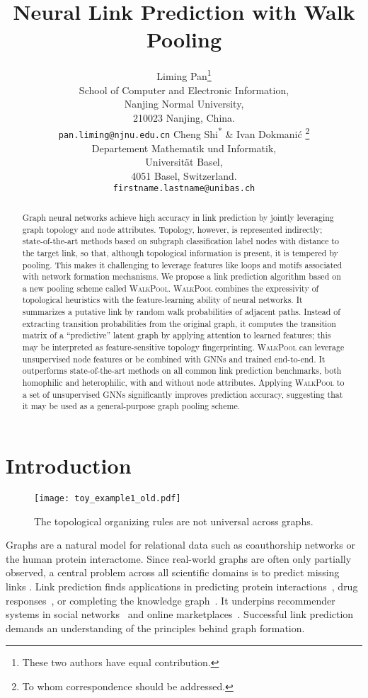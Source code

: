 \documentclass[11pt]{article}
\title{Neural Link Prediction with Walk Pooling}
\author{Liming Pan\thanks{These two authors have equal contribution.} \\
School of Computer and Electronic Information,\\
Nanjing Normal University,\\
210023 Nanjing, China. \\
\texttt{pan.liming@njnu.edu.cn}
\And
Cheng Shi\textsuperscript{*} \& Ivan Dokmanić \thanks{To whom correspondence should be addressed.}\\
Departement Mathematik und Informatik,\\
Universität Basel,\\
4051 Basel, Switzerland. \\
\texttt{firstname.lastname@unibas.ch}
}
\newcommand{\walkpool}{\textsc{WalkPool}\xspace}
\newcommand{\UPDATE}[1]{\textcolor{WowColor}{{#1}}}
\newcommand{\fTBD}[1]{\textcolor{SubtleColor}{}\marginnote{\tiny\textcolor{SubtleColor}{ {\tiny } #1}}}
\renewcommand{\fTBD}[1]{}
\renewcommand{\UPDATE}[1]{#1}
\begin{document}
\maketitle
\vspace{-4mm}
\begin{abstract}
    \vspace{-2mm}
    Graph neural networks achieve high accuracy in link prediction by jointly leveraging  graph topology and node attributes. Topology, however, is represented indirectly; state-of-the-art methods based on subgraph classification label nodes with distance to the target link, so that, although topological information is present, it is tempered by pooling. This makes it challenging to leverage features like loops and motifs associated with network formation mechanisms.\fTBD{Reminder for later: Pooling is not the only issue: even without it it would be hard (impossible?) to count loops etc from node distance labels.} We propose a link prediction algorithm based on a new pooling scheme called \walkpool. \walkpool combines the expressivity of topological heuristics with the feature-learning ability of neural networks. It summarizes a putative link by random walk probabilities of adjacent paths. Instead of extracting transition probabilities from the original graph, it computes the transition matrix of a ``predictive'' latent graph by applying attention to learned features; this may be interpreted as feature-sensitive topology fingerprinting. \walkpool can leverage unsupervised node features or be combined with GNNs and trained end-to-end. It outperforms state-of-the-art methods on all common link prediction benchmarks, both homophilic and heterophilic, with and without node attributes. Applying \walkpool to a set of unsupervised GNNs significantly improves prediction accuracy, suggesting that it may be used as a general-purpose graph pooling scheme.    
\end{abstract}
\vspace{-4mm}
\section{Introduction}
\begin{wrapfigure}{l}{0.44\textwidth} 
\centering
\texttt{[image: toy\_example1\_old.pdf]}
\caption{\UPDATE{The topological organizing rules are not universal across graphs.}}
\label{fig:learnwp}
\vspace{-2mm}
\end{wrapfigure}
Graphs are a natural model for relational data such as coauthorship networks or the human protein interactome. Since real-world graphs are often only partially observed, a central problem across all scientific domains is to predict missing links \citep{liben2007link}. Link prediction finds applications in predicting protein interactions~\citep{qi2006evaluation}, drug responses~\citep{stanfield2017drug}, or completing the knowledge graph~\citep{nickel2015review}. It underpins recommender systems in social networks~\citep{adamic2003friends} and online marketplaces~\citep{lu2012recommender}. 
Successful link prediction demands an understanding of the principles behind graph formation.
\end{document}
